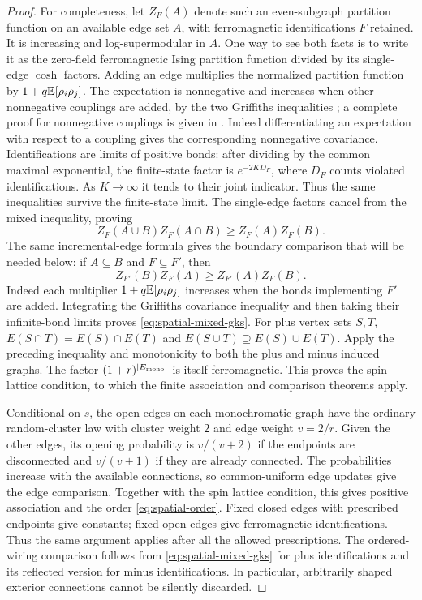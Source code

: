 \begin{proof}
For completeness, let $Z_F(A)$ denote such an even-subgraph partition
function on an available edge set $A$, with ferromagnetic
identifications $F$ retained. It is increasing and log-supermodular in
$A$. One way to see both facts is to write it as
the zero-field ferromagnetic Ising partition function divided by its
single-edge $\cosh$ factors. Adding an edge multiplies the normalized
partition function by $1+q\mathbb E[\rho_i\rho_j]$. The expectation is
nonnegative and increases when other nonnegative couplings are added,
by the two Griffiths inequalities \cite{Griffiths1967I}; a complete
proof for nonnegative couplings is given in
\cite[Section~3.8.1, Theorem~3.49]{FriedliVelenik2017}.
Indeed differentiating an expectation with respect to a coupling gives
the corresponding nonnegative covariance. Identifications are limits
of positive bonds: after dividing by the common maximal exponential,
the finite-state factor is $e^{-2K D_F}$, where $D_F$ counts violated
identifications. As $K\to\infty$ it tends to their joint indicator.
Thus the same inequalities survive the finite-state limit. The
single-edge factors cancel from the mixed inequality, proving
\[
       Z_F(A\cup B)Z_F(A\cap B)\ge Z_F(A)Z_F(B).
\]
The same incremental-edge formula gives the boundary comparison that
will be needed below: if $A\subseteq B$ and $F\subseteq F'$, then
\begin{equation}\label{eq:spatial-mixed-gks}
       Z_{F'}(B)Z_F(A)\ge Z_{F'}(A)Z_F(B).
\end{equation}
Indeed each multiplier $1+q\mathbb E[\rho_i\rho_j]$ increases when the bonds
implementing $F'$ are added. Integrating the Griffiths covariance
inequality and then taking their infinite-bond limits proves
\eqref{eq:spatial-mixed-gks}.
For plus vertex sets $S,T$,
$E(S\cap T)=E(S)\cap E(T)$ and
$E(S\cup T)\supseteq E(S)\cup E(T)$.
Apply the preceding inequality and monotonicity to both the plus and
minus induced graphs. The factor $(1+r)^{|E_{\rm mono}|}$ is itself
ferromagnetic. This proves the spin lattice condition, to which the
finite association and comparison theorems
\cite{FortuinKasteleynGinibre1971,Holley1974} apply.

Conditional on $s$, the open edges on each monochromatic graph have
the ordinary random-cluster law with cluster weight $2$ and edge
weight $v=2/r$. Given the other edges, its opening probability is
$v/(v+2)$ if the endpoints are disconnected and $v/(v+1)$ if they
are already connected. The probabilities increase with the available
connections, so common-uniform edge updates give the edge comparison.
Together with the spin lattice
condition, this gives positive association and the order
\eqref{eq:spatial-order}. Fixed closed edges with prescribed endpoints
give constants; fixed open edges give ferromagnetic identifications.
Thus the same argument applies after all the allowed prescriptions.
The ordered-wiring comparison follows from
\eqref{eq:spatial-mixed-gks} for plus identifications and its reflected
version for minus identifications. In particular,
arbitrarily shaped exterior connections cannot be silently discarded.


\end{proof}
